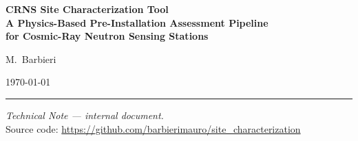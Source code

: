 \documentclass[11pt, a4paper]{article}
\begin{document}

\begin{titlepage}
\centering
\vspace*{2cm}

{\LARGE\bfseries CRNS Site Characterization Tool\\[0.5em]
\large A Physics-Based Pre-Installation Assessment Pipeline\\
for Cosmic-Ray Neutron Sensing Stations}

\vspace{1.5cm}
{\large M.\ Barbieri}

\vspace{0.5cm}
{\normalsize \today}

\vspace{1cm}
\rule{0.6\linewidth}{0.4pt}

\vspace{0.8cm}
\begin{minipage}{0.75\linewidth}
\centering\small
\textit{Technical Note — internal document.}\\
Source code: \url{https://github.com/barbierimauro/site_characterization}
\end{minipage}
\end{titlepage}

\tableofcontents
\newpage



\newpage


\newpage


\newpage


\newpage


\newpage


\newpage




\newpage



\appendix


\end{document}
